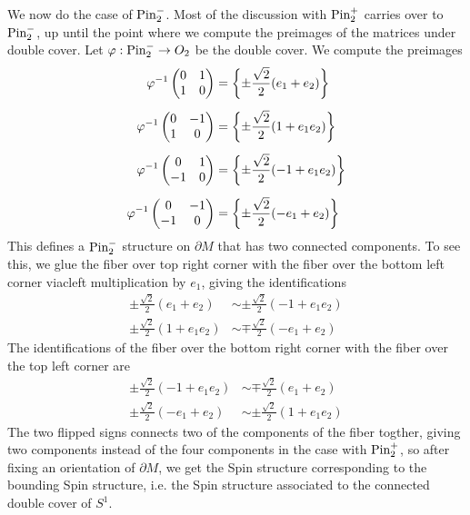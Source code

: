 \begin{exmp}
We now do the case of $\mathrm{Pin}^-_2$. Most of the discussion with $\mathrm{Pin}^+_2$ carries
over to $\mathrm{Pin}^-_2$, up until the point where we compute the preimages of
the matrices under double cover. Let $\varphi : \mathrm{Pin}_2^- \to O_2$ be the
double cover. We compute the preimages
%
\begin{align*}
\varphi^{-1}\begin{pmatrix}
0 & 1 \\
1 & 0
\end{pmatrix} &= \left\lbrace \pm \frac{\sqrt{2}}{2}(e_1 + e_2) \right\rbrace \\[5pt]
\varphi^{-1}\begin{pmatrix}
0 & -1 \\
1 & 0
\end{pmatrix} &= \left\lbrace \pm\frac{\sqrt{2}}{2}(1 + e_1e_2) \right\rbrace \\[5pt]
\varphi^{-1}\begin{pmatrix}
0 & 1 \\
-1 & 0
\end{pmatrix} &= \left\lbrace \pm\frac{\sqrt{2}}{2}(-1 + e_1e_2) \right\rbrace \\[5pt]
\varphi^{-1}\begin{pmatrix}
0 & -1 \\
-1 & 0
\end{pmatrix} &= \left\lbrace \pm\frac{\sqrt{2}}{2}(-e_1 + e_2) \right\rbrace
\end{align*}
%
This defines a $\mathrm{Pin}^-_2$ structure on $\partial M$ that has two connected
components. To see this, we glue the fiber over top right corner
with the fiber over the bottom left corner viacleft multiplication by $e_1$,
giving the identifications
%
\begin{align*}
\pm \frac{\sqrt{2}}{2}(e_1 + e_2) &\sim \pm\frac{\sqrt{2}}{2}(-1 + e_1e_2) \\
\pm\frac{\sqrt{2}}{2}(1 + e_1e_2) &\sim \mp\frac{\sqrt{2}}{2}(-e_1 + e_2)
\end{align*}
%
The identifications of the fiber over the bottom right corner with the fiber
over the top left corner are
%
\begin{align*}
\pm\frac{\sqrt{2}}{2}(-1 + e_1e_2) &\sim \mp\frac{\sqrt{2}}{2}(e_1 + e_2)\\
\pm\frac{\sqrt{2}}{2}(-e_1 + e_2) &\sim \pm\frac{\sqrt{2}}{2}(1 + e_1e_2)
\end{align*}
The two flipped signs connects two of the components of the fiber togther,
giving two components instead of the four components in the case with
$\mathrm{Pin}^+_2$, so after fixing an orientation of $\partial M$, we get the Spin
structure corresponding to the bounding Spin structure, i.e. the Spin structure
associated to the connected double cover of $S^1$.
%
\end{exmp}
